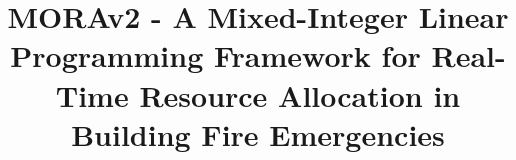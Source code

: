 \documentclass[conference,a4paper,english]{IEEEtran}[2015/08/26]
\begin{document}

\title{MORAv2 - A Mixed-Integer Linear Programming Framework for Real-Time Resource Allocation in Building Fire Emergencies}

\author{

}


\maketitle
%
%

\end{document}
